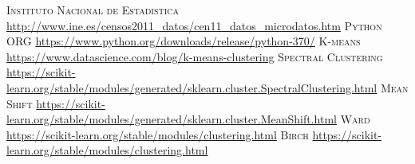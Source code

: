 	\begin{thebibliography}{99}
		\textsc{Instituto Nacional de Estadistica}
		\newline
		\url{http://www.ine.es/censos2011_datos/cen11_datos_microdatos.htm}	
		\textsc{Python ORG}
		\newline
		\url{https://www.python.org/downloads/release/python-370/}	
		\textsc{K-means}
		\newline
		\url{https://www.datascience.com/blog/k-means-clustering}
		\textsc{Spectral Clustering}
		\newline
		\url{https://scikit-learn.org/stable/modules/generated/sklearn.cluster.SpectralClustering.html}
		\textsc{Mean Shift}
		\newline
		\url{https://scikit-learn.org/stable/modules/generated/sklearn.cluster.MeanShift.html}
		\textsc{Ward}
		\newline
		\url{https://scikit-learn.org/stable/modules/clustering.html}
		\textsc{Birch}
		\newline
		\url{https://scikit-learn.org/stable/modules/clustering.html}
	\end{thebibliography}


